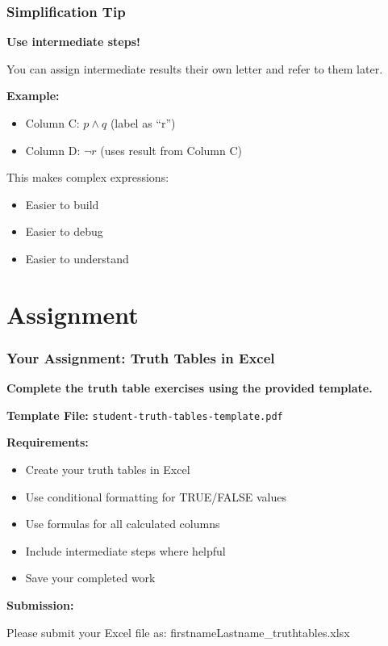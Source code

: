 \documentclass{beamer}
\begin{document}
\begin{frame}
\frametitle{Simplification Tip}
\textbf{Use intermediate steps!}\pause

You can assign intermediate results their own letter and refer to them later.\pause

\vspace{0.3cm}
\textbf{Example:}
\begin{itemize}
    \item Column C: $p \wedge q$ (label as ``r'')\pause
    \item Column D: $\neg r$ (uses result from Column C)
\end{itemize}\pause

\vspace{0.3cm}
This makes complex expressions:
\begin{itemize}
    \item Easier to build\pause
    \item Easier to debug\pause
    \item Easier to understand
\end{itemize}
\end{frame}

\section{Assignment}

\begin{frame}
\frametitle{Your Assignment: Truth Tables in Excel}
\textbf{Complete the truth table exercises using the provided template.}\pause

\vspace{0.3cm}
\textbf{Template File:} \texttt{student-truth-tables-template.pdf}\pause

\vspace{0.3cm}
\textbf{Requirements:}
\begin{itemize}
    \item Create your truth tables in Excel\pause
    \item Use conditional formatting for TRUE/FALSE values\pause
    \item Use formulas for all calculated columns\pause
    \item Include intermediate steps where helpful\pause
    \item Save your completed work
\end{itemize}\pause

\vspace{0.3cm}
\textbf{Submission:}

Please submit your Excel file as: \alert{firstnameLastname\_truthtables.xlsx}
\end{frame}
\end{document}
